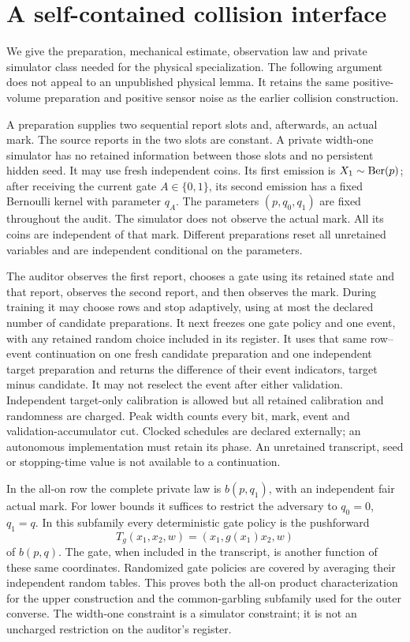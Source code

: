 \section{A self-contained collision interface}
\label{sec:physical-bridge}
We give the preparation, mechanical estimate, observation law and
private simulator class needed for the physical specialization. The
following argument does not appeal to an unpublished physical lemma.
It retains the same positive-volume preparation and positive sensor
noise as the earlier collision construction.

\begin{definition}
\label{def:physical-class}
A preparation supplies two sequential report slots and, afterwards, an
actual mark. The source reports in the two slots are constant. A private
width-one simulator has no retained information between those slots
and no persistent hidden seed. It may use fresh independent coins.
Its first emission is $X_1\sim\operatorname{Ber}(p)$; after receiving the current
gate $A\in\{0,1\}$, its second emission has a fixed Bernoulli kernel
with parameter $q_A$. The parameters $(p,q_0,q_1)$ are fixed throughout
the audit. The simulator does not observe the actual mark. All its
coins are independent of that mark. Different preparations reset all
unretained variables and are independent conditional on the parameters.

The auditor observes the first report, chooses a gate using its retained
state and that report, observes the second report, and then observes the
mark. During training it may choose rows and stop adaptively, using at
most the declared number of candidate preparations. It next freezes
one gate policy and one event, with any retained random choice included
in its register. It uses that same row--event continuation on one fresh
candidate preparation and one independent target preparation and returns
the difference of their event indicators, target minus candidate.
It may not reselect the event after either validation. Independent
target-only calibration is allowed but all retained calibration and
randomness are charged. Peak width counts every bit, mark, event and
validation-accumulator cut. Clocked schedules are declared externally;
an autonomous implementation must retain its phase. An unretained
transcript, seed or stopping-time value is not available to a continuation.
\end{definition}

In the all-on row the complete private law is $b(p,q_1)$, with an
independent fair actual mark. For lower bounds it suffices to restrict
the adversary to $q_0=0$, $q_1=q$. In this subfamily every deterministic
gate policy is the pushforward
\[
 T_g(x_1,x_2,w)=(x_1,g(x_1)x_2,w)
\]
of $b(p,q)$. The gate, when included in the transcript, is another
function of these same coordinates. Randomized gate policies are
covered by averaging their independent random tables. This proves
both the all-on product characterization for the upper construction
and the common-garbling subfamily used for the outer converse. The
width-one constraint is a simulator constraint; it is not an uncharged
restriction on the auditor's register.


